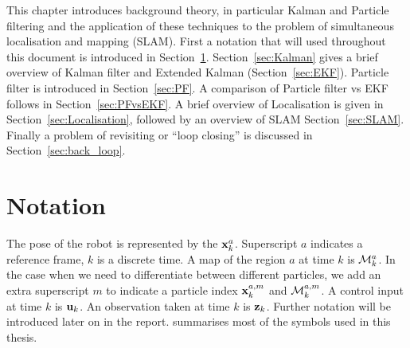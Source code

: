 This chapter introduces background theory, in particular Kalman and
Particle filtering and the application of these techniques to the
problem of simultaneous localisation and mapping (SLAM). First a
notation that will used throughout this document is introduced in
Section~\ref{sec:Notation}. Section~\ref{sec:Kalman} gives a brief
overview of Kalman filter and Extended Kalman (Section~\ref{sec:EKF}).
Particle filter is introduced in Section~\ref{sec:PF}. A comparison of
Particle filter vs EKF follows in Section~\ref{sec:PFvsEKF}. A brief
overview of Localisation is given in Section~\ref{sec:Localisation},
followed by an overview of SLAM Section~\ref{sec:SLAM}. Finally a
problem of revisiting or ``loop closing'' is discussed in
Section~\ref{sec:back_loop}.


\section {Notation}
\label{sec:Notation}

The pose of the robot is represented by the $\x{k}{}{a}$. Superscript
$a$ indicates a reference frame, $k$ is a discrete time. A map of the
region $a$ at time $k$ is $\map{k}{}{a}$. In the case when we need to
differentiate between different particles, we add an extra superscript
$m$ to indicate a particle index $\x{k}{a}{m}$ and $\map{k}{a}{m}$. A
control input at time $k$ is ${\bf u}_{k}$. An observation taken at time $k$
is ${\bf z}_{k}$. Further notation will be introduced later on in the
report.  summarises most of the symbols used in
this thesis.




